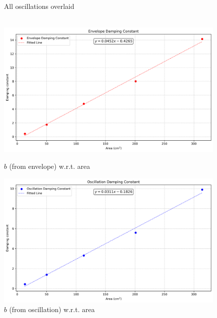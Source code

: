 \documentclass[12pt,letterpaper]{article}
\begin{document}
\begin{figure}[]
  \caption{All oscillations overlaid}\label{fig:all}
\endminipage\hfill
\\
  \includegraphics[width=\linewidth]{images/b-env.png}
  \caption{$b$ (from envelope) w.r.t. area}\label{fig:benv}
\endminipage\hfill
{}
  \includegraphics[width=\linewidth]{images/b-osc.png}
  \caption{$b$ (from oscillation) w.r.t. area}\label{fig:bosc}
\endminipage\hfill
\end{figure}


% 
% 
\end{document}

